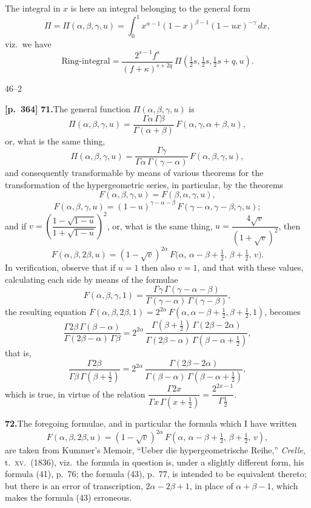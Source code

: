 \documentclass[11pt]{article}
\begin{document}
The integral in $x$ is here an integral belonging to the general form
\[
\Pi = \Pi(\alpha,\beta,\gamma,u) = \int_{0}^{1} x^{\alpha-1}(1-x)^{\beta-1}(1-ux)^{-\gamma}\,dx,
\]
viz.\ we have
\[
\text{Ring-integral} = \frac{2^{s-1}f^{s}}{(f+\kappa)^{s+2q}}\,\Pi(\tfrac{1}{2}s,\tfrac{1}{2}s,\tfrac{1}{2}s+q,u).
\]

\hfill 46--2

\bigskip

\noindent\textbf{[p.~364]}\quad
\textbf{71.}\quad The general function $\Pi(\alpha,\beta,\gamma,u)$ is
\[
\Pi(\alpha,\beta,\gamma,u) = \frac{\Gamma\alpha\,\Gamma\beta}{\Gamma(\alpha+\beta)}\,F(\alpha,\gamma,\alpha+\beta,u),
\]
or, what is the same thing,
\[
\Pi(\alpha,\beta,\gamma,u) = \frac{\Gamma\gamma}{\Gamma\alpha\,\Gamma(\gamma-\alpha)}\,F(\alpha,\beta,\gamma,u),
\]
and consequently transformable by means of various theorems for the transformation of the hypergeometric series, in particular, by the theorems
\[
F(\alpha,\beta,\gamma,u) = F(\beta,\alpha,\gamma,u),
\]
\[
F(\alpha,\beta,\gamma,u) = (1-u)^{\gamma-\alpha-\beta}\,F(\gamma-\alpha,\gamma-\beta,\gamma,u);
\]
and if $v = \left(\dfrac{1-\sqrt{1-u}}{1+\sqrt{1-u}}\right)^{2}$, or, what is the same thing, $u = \dfrac{4\sqrt{v}}{(1+\sqrt{v})^{2}}$, then
\[
F(\alpha,\beta,2\beta,u) = (1-\sqrt{v})^{2\alpha}\,F\bigl(\alpha,\,\alpha-\beta+\tfrac{1}{2},\,\beta+\tfrac{1}{2},\,v\bigr).
\]
In verification, observe that if $u=1$ then also $v=1$, and that with these values, calculating each side by means of the formulae
\[
F(\alpha,\beta,\gamma,1) = \frac{\Gamma\gamma\,\Gamma(\gamma-\alpha-\beta)}{\Gamma(\gamma-\alpha)\,\Gamma(\gamma-\beta)},
\]
the resulting equation $F(\alpha,\beta,2\beta,1) = 2^{2\alpha}\,F(\alpha,\alpha-\beta+\tfrac{1}{2},\beta+\tfrac{1}{2},1)$, becomes
\[
\frac{\Gamma 2\beta\,\Gamma(\beta-\alpha)}{\Gamma(2\beta-\alpha)\,\Gamma\beta}
= 2^{2\alpha}\,\frac{\Gamma(\beta+\tfrac{1}{2})\,\Gamma(2\beta-2\alpha)}{\Gamma(2\beta-\alpha)\,\Gamma(\beta-\alpha+\tfrac{1}{2})},
\]
that is,
\[
\frac{\Gamma 2\beta}{\Gamma\beta\,\Gamma(\beta+\tfrac{1}{2})}
= 2^{2\alpha}\,\frac{\Gamma(2\beta-2\alpha)}{\Gamma(\beta-\alpha)\,\Gamma(\beta-\alpha+\tfrac{1}{2})},
\]
which is true, in virtue of the relation $\dfrac{\Gamma 2x}{\Gamma x\,\Gamma(x+\tfrac{1}{2})} = \dfrac{2^{2x-1}}{\Gamma\tfrac{1}{2}}$.

\bigskip

\noindent\textbf{72.}\quad The foregoing formulae, and in particular the formula which I have written
\[
F(\alpha,\beta,2\beta,u) = (1-\sqrt{v})^{2\alpha}\,F(\alpha,\,\alpha-\beta+\tfrac{1}{2},\,\beta+\tfrac{1}{2},\,v),
\]
are taken from Kummer's Memoir, ``Ueber die hypergeometrische Reihe,'' \textit{Crelle}, t.\ \textsc{xv}.\ (1836), viz.\ the formula in question is, under a slightly different form, his formula (41), p.\ 76; the formula (43), p.\ 77, is intended to be equivalent thereto; but there is an error of transcription, $2\alpha-2\beta+1$, in place of $\alpha+\beta-1$, which makes the formula (43) erroneous.
\end{document}
